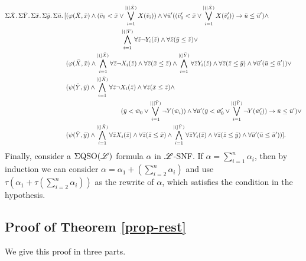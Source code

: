 \begin{align*}
\sa{\bar{X}}\sa{\bar{Y}}\sa{\bar{x}}\sa{\bar{y}}\sa{\bar{u}}[&(\varphi(\bar{X},\bar{x})\wedge(\bar{v}_0 < \bar{x} \vee \bigvee_{i = 1}^{\length(\bar{X})}X(\bar{v}_i))\wedge \forall\bar{u}'((\bar{v}_0' < \bar{x} \vee \bigvee_{i = 1}^{\length(\bar{X})}X(\bar{v}_i'))\to\bar{u}\leq\bar{u}') \wedge \\
& \hspace{3cm}  \bigwedge_{i = 1}^{\length(\bar{Y})} \forall\bar{z}\neg Y_i(\bar{z}) \wedge \forall\bar{z}(\bar{y}\leq\bar{z})\vee\\
&
(\varphi(\bar{X},\bar{x})\wedge\bigwedge_{i = 1}^{\length(\bar{X})} \forall\bar{z}\neg X_i(\bar{z}) \wedge \forall\bar{z}(\bar{x}\leq\bar{z})\wedge\bigwedge_{i = 1}^{\length(\bar{Y})} \forall\bar{z} Y_i(\bar{z}) \wedge \forall\bar{z}(\bar{z}\leq\bar{y})\wedge\forall\bar{u}'(\bar{u}\leq\bar{u}'))\vee
\\
&(\psi(\bar{Y},\bar{y})\wedge\bigwedge_{i = 1}^{\length(\bar{X})} \forall\bar{z}\neg X_i(\bar{z}) \wedge \forall\bar{z}(\bar{x}\leq\bar{z})\wedge \\
& \hspace{3cm} (\bar{y} < \bar{w}_0 \vee \bigvee_{i = 1}^{\length(\bar{Y})}\neg Y(\bar{w}_i))\wedge\forall\bar{u}'(\bar{y} < \bar{w}_0' \vee \bigvee_{i = 1}^{\length(\bar{Y})}\neg Y(\bar{w}_i'))\to\bar{u}\leq\bar{u}')\vee \\
&(\psi(\bar{Y},\bar{y})\wedge\bigwedge_{i = 1}^{\length(\bar{X})} \forall\bar{z} X_i(\bar{z}) \wedge \forall\bar{z}(\bar{z}\leq\bar{x})\wedge\bigwedge_{i = 1}^{\length(\bar{Y})} \forall\bar{z} Y_i(\bar{z}) \wedge \forall\bar{z}(\bar{z}\leq\bar{y})\wedge\forall\bar{u}'(\bar{u}\leq\bar{u}'))].
\end{align*}
Finally, consider a $\Sigma{\rm QSO}(\mathscr{L})$ formula $\alpha$ in $\mathscr{L}$-SNF. If $\alpha = \sum_{i = 1}^n\alpha_i$, then by induction we can consider $\alpha = \alpha_1 + (\sum_{i = 2}^n\alpha_i)$ and use $\tau(\alpha_1 + \tau(\sum_{i = 2}^n\alpha_i))$ as the rewrite of $\alpha$, which satisfies the condition in the hypothesis.










\subsection*{Proof of Theorem \ref{prop-rest}}
We give this proof in three parts.

